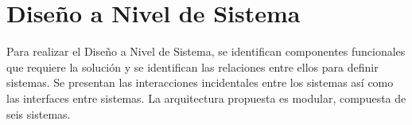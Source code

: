 \section {Diseño a Nivel de Sistema}

Para realizar el Diseño a Nivel de Sistema, se identifican componentes funcionales que requiere la solución y se identifican las relaciones entre ellos para definir sistemas. Se presentan las interacciones incidentales entre los sistemas así como las interfaces entre sistemas. La arquitectura propuesta es modular, compuesta de seis sistemas.


